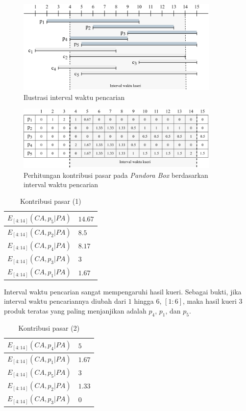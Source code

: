 \begin{figure}[h]
	\centering
	\includegraphics[width=10cm]{assets/img/bab3/timeline-interval.png}
	\caption{Ilustrasi interval waktu pencarian}
	\label{fig:timeline-kueri}
\end{figure}

\begin{figure}[h]
	\centering
	\includegraphics[width=10cm]{assets/img/bab3/pbox-kueri.png}
	\caption{Perhitungan kontribusi pasar pada \textit{Pandora Box} berdasarkan interval waktu pencarian}
	\label{fig:pbox-kueri}
\end{figure}

\begin{table}[H]
	\small
	\centering
	\begin{tabular}{|p{4cm}|p{2cm}|}
		\hline
		$E_{[4:14]}(CA, p_5|PA)$ & $14.67$ \\ \hline
		$E_{[4:14]}(CA, p_2|PA)$ & $8.5$ \\ \hline
		$E_{[4:14]}(CA, p_4|PA)$ & $8.17$ \\ \hline
		$E_{[4:14]}(CA, p_3|PA)$ & $3$ \\ \hline
		$E_{[4:14]}(CA, p_1|PA)$ & $1.67$ \\ \hline
	\end{tabular} 
	\caption{Kontribusi pasar (1)}
	\label{tab:mc-ti-res}
\end{table}

Interval waktu pencarian sangat mempengaruhi hasil kueri. Sebagai bukti, jika interval waktu pencariannya diubah dari $1$ hingga $6$, $[1:6]$, maka hasil kueri $3$ produk teratas yang paling menjanjikan adalah $p_4$, $p_1$, dan $p_5$.

\begin{table}[H]
	\small
	\centering
	\begin{tabular}{|p{3cm}|p{2cm}|}
		\hline
		$E_{[4:14]}(CA, p_4|PA)$ & $5$ \\ \hline
		$E_{[4:14]}(CA, p_1|PA)$ & $1.67$ \\ \hline
		$E_{[4:14]}(CA, p_5|PA)$ & $3$ \\ \hline
		$E_{[4:14]}(CA, p_2|PA)$ & $1.33$ \\ \hline
		$E_{[4:14]}(CA, p_3|PA)$ & $0$ \\ \hline
	\end{tabular} 
	\caption{Kontribusi pasar (2)}
	\label{tab:mc-ti-res2}
\end{table}

